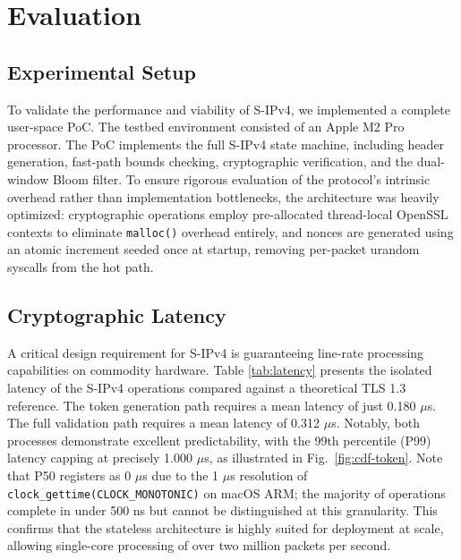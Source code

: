 \documentclass[journal]{IEEEtran}
\begin{document}
\section{Evaluation}
\label{sec:evaluation}

\subsection{Experimental Setup}
To validate the performance and viability of S-IPv4, we implemented a complete user-space PoC. The testbed environment consisted of an Apple M2 Pro processor. The PoC implements the full S-IPv4 state machine, including header generation, fast-path bounds checking, cryptographic verification, and the dual-window Bloom filter. To ensure rigorous evaluation of the protocol's intrinsic overhead rather than implementation bottlenecks, the architecture was heavily optimized: cryptographic operations employ pre-allocated thread-local OpenSSL contexts to eliminate \texttt{malloc()} overhead entirely, and nonces are generated using an atomic increment seeded once at startup, removing per-packet urandom syscalls from the hot path.

\subsection{Cryptographic Latency}
A critical design requirement for S-IPv4 is guaranteeing line-rate processing capabilities on commodity hardware. Table \ref{tab:latency} presents the isolated latency of the S-IPv4 operations compared against a theoretical TLS 1.3 reference. The token generation path requires a mean latency of just 0.180 $\mu$s. The full validation path requires a mean latency of 0.312 $\mu$s. Notably, both processes demonstrate excellent predictability, with the 99th percentile (P99) latency capping at precisely 1.000 $\mu$s, as illustrated in Fig.~\ref{fig:cdf-token}. Note that P50 registers as 0 $\mu$s due to the 1 $\mu$s resolution of \texttt{clock\_gettime(CLOCK\_MONOTONIC)} on macOS ARM; the majority of operations complete in under 500 ns but cannot be distinguished at this granularity. This confirms that the stateless architecture is highly suited for deployment at scale, allowing single-core processing of over two million packets per second.
\end{document}

